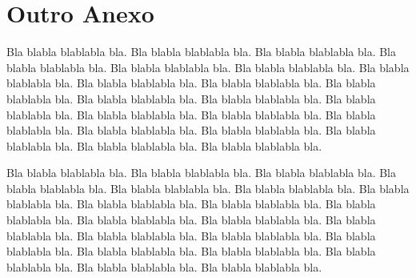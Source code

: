 \documentclass[diss,capa]{texufpel}
\begin{document}
\chapter{Outro Anexo}

Bla blabla blablabla bla.  Bla blabla blablabla bla.  Bla blabla
blablabla bla.  Bla blabla blablabla bla.  Bla blabla blablabla bla.
Bla blabla blablabla bla.  Bla blabla blablabla bla.  Bla blabla
blablabla bla.  Bla blabla blablabla bla.  Bla blabla blablabla bla.
Bla blabla blablabla bla.  Bla blabla blablabla bla.  Bla blabla
blablabla bla.  Bla blabla blablabla bla.  Bla blabla blablabla bla.
Bla blabla blablabla bla.  Bla blabla blablabla bla.  Bla blabla
blablabla bla.  Bla blabla blablabla bla.  Bla blabla blablabla bla.
Bla blabla blablabla bla.

Bla blabla blablabla bla.  Bla blabla blablabla bla.  Bla blabla
blablabla bla.  Bla blabla blablabla bla.  Bla blabla blablabla bla.
Bla blabla blablabla bla.  Bla blabla blablabla bla.  Bla blabla
blablabla bla.  Bla blabla blablabla bla.  Bla blabla blablabla bla.
Bla blabla blablabla bla.  Bla blabla blablabla bla.  Bla blabla
blablabla bla.  Bla blabla blablabla bla.  Bla blabla blablabla bla.
Bla blabla blablabla bla.  Bla blabla blablabla bla.  Bla blabla
blablabla bla.  Bla blabla blablabla bla.  Bla blabla blablabla bla.
Bla blabla blablabla bla.
\end{document}
